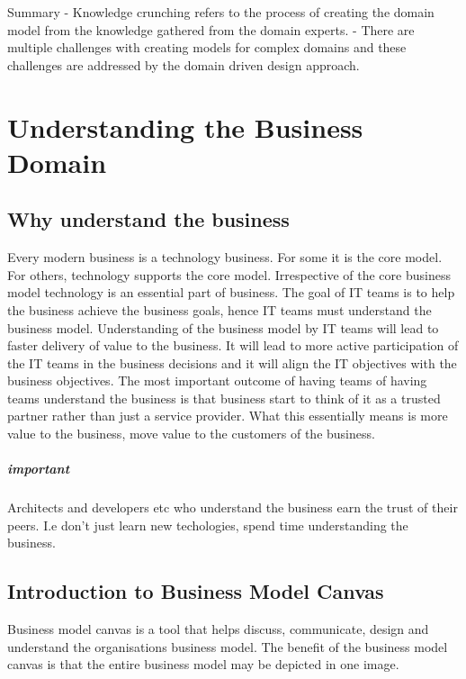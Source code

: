\documentclass[a4paper, 11pt]{book}
\begin{document}
    Summary
    - Knowledge crunching refers to the process of creating the domain model from the knowledge gathered from the domain experts.
    - There are multiple challenges with creating models for complex domains and these challenges are addressed by the domain driven design approach.


    \chapter{Understanding the Business Domain}


    \section{Why understand the business}
    Every modern business is a technology business. For some it is the core model. For others, technology supports the core model.
    Irrespective of the core business model technology is an essential part of business.
    The goal of IT teams is to help the business achieve the business goals, hence IT teams must understand the business model.
    Understanding of the business model by IT teams will lead to faster delivery of value to the business.
    It will lead to more active participation of the IT teams in the business decisions and it will align the IT objectives with the business objectives.
    The most important outcome of having teams of having teams understand the business is that business start to think of it as a trusted partner rather than just a service provider.
    What this essentially means is more value to the business, move value to the customers of the business.

    \paragraph{important}
    Architects and developers etc who understand the business earn the trust of their peers.
    I.e don't just learn new techologies, spend time understanding the business.


    \section{Introduction to Business Model Canvas}
    Business model canvas is a tool that helps discuss, communicate, design and understand the organisations business model.
    The benefit of the business model canvas is that the entire business model may be depicted in one image.
\end{document}
